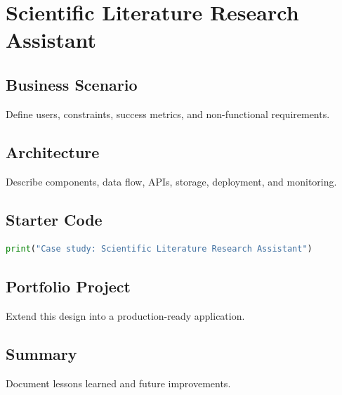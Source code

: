 \chapter{Scientific Literature Research Assistant}
\label{chap:vol14-8}



\section{Business Scenario}
Define users, constraints, success metrics, and non-functional requirements.

\section{Architecture}
Describe components, data flow, APIs, storage, deployment, and monitoring.

\section{Starter Code}
\begin{lstlisting}[language=Python]
print("Case study: Scientific Literature Research Assistant")
\end{lstlisting}

\section{Portfolio Project}
Extend this design into a production-ready application.

\section{Summary}
Document lessons learned and future improvements.
